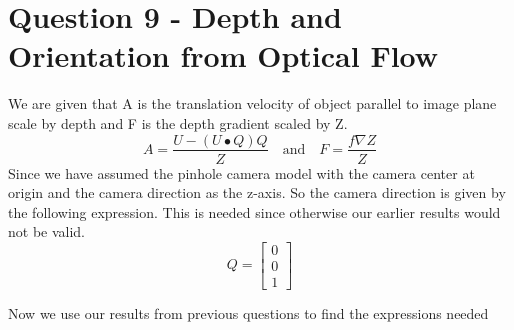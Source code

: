 \documentclass[12pt]{article}
\begin{document}
\section{Question 9 - Depth and Orientation from Optical Flow}
We are given that A is the translation velocity of object parallel to image plane scale by depth and F is the depth gradient scaled by Z.
$$ A = \dfrac{U-(U\bullet Q)Q}{Z} \quad\text{and}\quad F = \dfrac{f\nabla Z}{Z}$$
Since we have assumed the pinhole camera model with the camera center at origin and the camera direction as the z-axis. So the camera direction is given by the following expression. This is needed since otherwise our earlier results would not be valid.
$$ Q =\left[  \begin{matrix} 0 \\ 0 \\ 1\end{matrix} \right]$$

Now we use our results from previous questions to find the expressions needed
\end{document}
